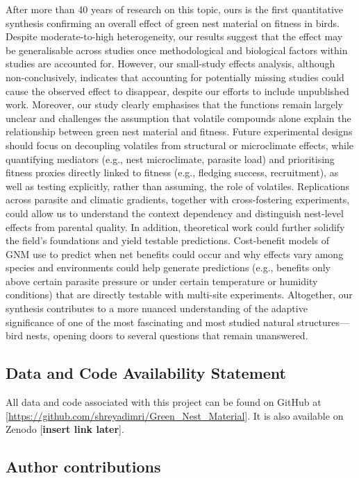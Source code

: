 \documentclass[
  number,
  review,
  onecolumn]{elsarticle}
\begin{document}
After more than 40 years of research on this topic, ours is the first
quantitative synthesis confirming an overall effect of green nest
material on fitness in birds. Despite moderate-to-high heterogeneity,
our results suggest that the effect may be generalisable across studies
once methodological and biological factors within studies are accounted
for. However, our small-study effects analysis, although
non-conclusively, indicates that accounting for potentially missing
studies could cause the observed effect to disappear, despite our
efforts to include unpublished work. Moreover, our study clearly
emphasises that the functions remain largely unclear and challenges the
assumption that volatile compounds alone explain the relationship
between green nest material and fitness. Future experimental designs
should focus on decoupling volatiles from structural or microclimate
effects, while quantifying mediators (e.g., nest microclimate, parasite
load) and prioritising fitness proxies directly linked to fitness (e.g.,
fledging success, recruitment), as well as testing explicitly, rather
than assuming, the role of volatiles. Replications across parasite and
climatic gradients, together with cross-fostering experiments, could
allow us to understand the context dependency and distinguish nest-level
effects from parental quality. In addition, theoretical work could
further solidify the field's foundations and yield testable predictions.
Cost-benefit models of GNM use to predict when net benefits could occur
and why effects vary among species and environments could help generate
predictions (e.g., benefits only above certain parasite pressure or
under certain temperature or humidity conditions) that are directly
testable with multi-site experiments. Altogether, our synthesis
contributes to a more nuanced understanding of the adaptive significance
of one of the most fascinating and most studied natural
structures---bird nests, opening doors to several questions that remain
unanswered.

\subsection{Data and Code Availability
Statement}\label{data-and-code-availability-statement}

All data and code associated with this project can be found on GitHub at
{[}\url{https://github.com/shreyadimri/Green_Nest_Material}{]}. It is
also available on Zenodo {[}\textbf{insert link later}{]}.

\subsection{Author contributions}\label{author-contributions}
\end{document}

